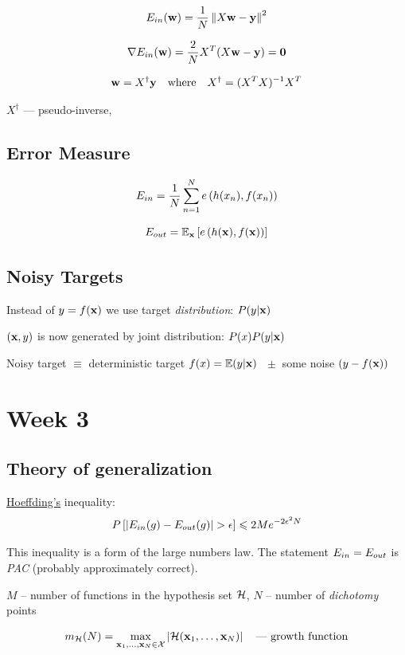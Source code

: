 \documentclass[a4paper,11pt]{article}
\renewcommand{\vec}[1]{\mathbf{#1}}
\begin{document}
\[ \iiEin(\iiw) = \frac{1}{N} \left\| X \iiw - \iiy \right\|^2 \]

\[ \nabla \iiEin(\iiw) = \frac{2}{N} X^T (X \iiw - \iiy) = \vec{0} \]

\[ \iiw = X^\dagger \iiy  \quad \text{where} \quad  X^\dagger = (X^T X)^{-1} X^T \]

$X^\dagger$ --- pseudo-inverse, 

\subsection{Error Measure}

\[ E_{in} = \frac{1}{N} \sum_{n=1}^{N} e\left(h(x_n),f(x_n)\right) \]

\[ \iiEout = \iiE_{\iix}\left[ e\left(h(\iix),f(\iix)\right) \right]  \]

\subsection{Noisy Targets}

Instead of $y=f(\iix)$ we use target \emph{distribution}: $ P(y|\iix) $

$(\iix,y)$ is now generated by joint distribution: $ P(x) P(y|\iix) $

Noisy target $\equiv$ deterministic target $f(x) = \iiE(y|\iix)$
$\; \pm$ some noise $\left( y - f(\iix) \right)$

\section{Week 3}

\subsection{Theory of generalization}

\def\iimH{m_\iiH}

\href{https://en.wikipedia.org/wiki/Hoeffding%27s_inequality}{Hoeffding's} inequality:
\[ P\left[|E_{in}(g) - E_{out}(g)| > \epsilon \right] \leqslant 2Me^{-2 \epsilon^2 N} \]

This inequality is a form of the large numbers law.
The statement $E_{in}=E_{out}$ is \emph{PAC} (probably approximately correct).

$M$ -- number of functions in the hypothesis set $\mathcal{H}$,
$N$ -- number of \emph{dichotomy} points

\[ \iimH(N) = \max_{\iix_1,\dots,\iix_N\in\iiX}
                    \left| \iiH(\iix_1,\dots,\iix_N) \right|
   \quad\text{--- growth function} \]
\end{document}
